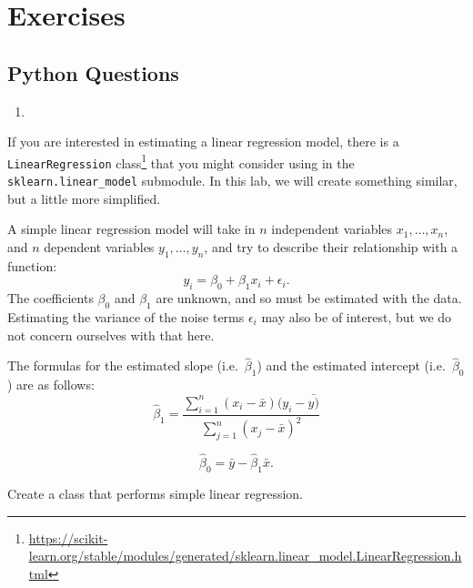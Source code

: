 \documentclass[
  12pt,
  krantz2]{krantz}
\providecommand{\tightlist}{%
  \setlength{\itemsep}{0pt}\setlength{\parskip}{0pt}}
\renewcommand{\href}[2]{#2\footnote{\url{#1}}}
\begin{document}
\hypertarget{exercises-11}{%
\section{Exercises}\label{exercises-11}}

\hypertarget{python-questions-10}{%
\subsection{Python Questions}\label{python-questions-10}}

\begin{enumerate}
\def\labelenumi{\arabic{enumi}.}
\tightlist
\item
\end{enumerate}

If you are interested in estimating a linear regression model, there is a \href{https://scikit-learn.org/stable/modules/generated/sklearn.linear_model.LinearRegression.html}{\texttt{LinearRegression} class} that you might consider using in the \texttt{sklearn.linear\_model} submodule. In this lab, we will create something similar, but a little more simplified.

A simple linear regression model will take in \(n\) independent variables \(x_1, \ldots, x_n\), and \(n\) dependent variables \(y_1, \ldots, y_n\), and try to describe their relationship with a function:
\begin{equation} 
y_i = \beta_0 + \beta_1 x_i + \epsilon_i.
\end{equation}
The coefficients \(\beta_0\) and \(\beta_1\) are unknown, and so must be estimated with the data. Estimating the variance of the noise terms \(\epsilon_i\) may also be of interest, but we do not concern ourselves with that here.

The formulas for the estimated slope (i.e.~\(\hat{\beta}_1\)) and the estimated intercept (i.e.~\(\hat{\beta}_0\)) are as follows:
\begin{equation} 
\hat{\beta}_1 = \frac{\sum_{i=1}^n (x_i - \bar{x})(y_i-\bar{y)}}{\sum_{j=1}^n (x_j - \bar{x})^2} 
\end{equation}

\begin{equation} 
\hat{\beta}_0 = \bar{y} - \hat{\beta}_1\bar{x}.
\end{equation}

Create a class that performs simple linear regression.
\end{document}
